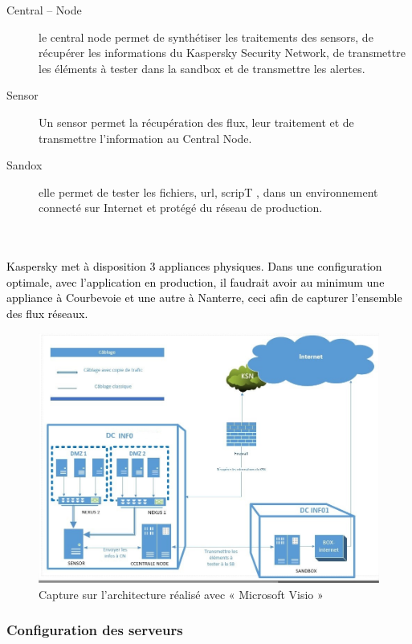\begin{description}
	\item [Central – Node] le central node permet de synthétiser les traitements des sensors, de récupérer les informations du Kaspersky Security Network, de transmettre les éléments à tester dans la sandbox et de transmettre les alertes.
	\item [Sensor] Un sensor permet la récupération des flux, leur traitement et de transmettre l’information au Central Node.
	\item [Sandox] elle permet de tester les fichiers, url, scripT , dans un environnement connecté sur Internet et protégé du réseau de production.
	
\end{description}
	
~~\\
~~\\
\textcolor{black}{Kaspersky met à disposition 3 appliances physiques. Dans une configuration optimale, avec l’application en production, il faudrait avoir au minimum une appliance à Courbevoie et une autre à Nanterre, ceci afin de capturer l’ensemble des flux réseaux.}

\begin{figure}[H]
	\begin{center}
		\includegraphics[width=0.9\linewidth]{Projet_KATA/archi_kata}
\end{center}
	\caption{Capture sur l’architecture réalisé avec « Microsoft Visio »}
	\label{fig:6}	
\end{figure}		 
		 
\subsubsection{Configuration des serveurs }

